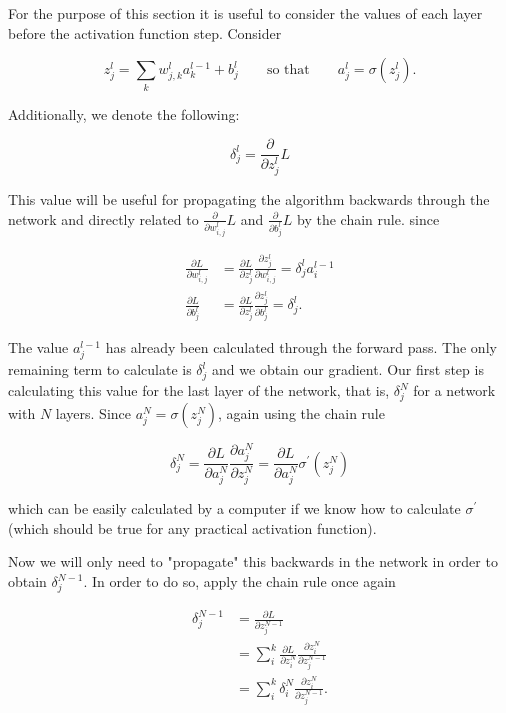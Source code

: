 For the purpose of this section it is useful to consider the values of each layer before the activation function step. Consider

\begin{equation*}
  z^l_j = \sum_k w^l_{j, k} a^{l - 1}_k + b^l_j \qquad \text{so that} \qquad a^l_j = \sigma (z^l_j).
\end{equation*}

Additionally, we denote the following:

\begin{equation}
  \delta^l_j = \frac{\partial}{\partial z^l_j} L
\end{equation}

This value will be useful for propagating the algorithm backwards through the network and directly related to $\frac{\partial}{\partial w^l_{i, j}} L$ and $\frac{\partial}{\partial b^l_j} L$ by the chain rule. since

\begin{align}
  \frac{\partial L}{\partial w^l_{i, j}}  &= \frac{\partial L}{\partial z^l_j} \frac{\partial z^l_j}{\partial w^l_{i, j}} = \delta^l_j a^{l - 1}_i \\
  \frac{\partial L}{\partial b^l_j} &= \frac{\partial L}{\partial z^l_j} \frac{\partial z^l_j}{\partial b^l_j} = \delta^l_j.
\end{align}

The value $a^{l - 1}_j$ has already been calculated through the forward pass. The only remaining term to calculate is $\delta^l_j$ and we obtain our gradient. Our first step is calculating this value for the last layer of the network, that is, $\delta^N_j$ for a network with $N$ layers. Since $a^{N}_j = \sigma (z^N_j)$, again using the chain rule

\begin{equation}
  \delta^N_j = \frac{\partial L}{\partial a^N_j} \frac{\partial a^N_j}{\partial z^N_j} = \frac{\partial L}{\partial a^N_j} \sigma^{\prime}(z^N_j)
\end{equation}

which can be easily calculated by a computer if we know how to calculate $\sigma^{\prime}$ (which should be true for any practical activation function).

Now we will only need to "propagate" this backwards in the network in order to obtain $\delta^{N - 1}_j$. In order to do so, apply the chain rule once again

\begin{align*}
  \delta^{N - 1}_j &= \frac{\partial L}{\partial z^{N - 1}_j} \\
                   &= \sum_i^k \frac{\partial L}{\partial z^{N}_i} \frac{\partial z^N_i}{\partial z^{N - 1}_j} \\
                   &= \sum_i^k \delta^N_i \frac{\partial z^N_i}{\partial z^{N - 1}_j}.
\end{align*}

